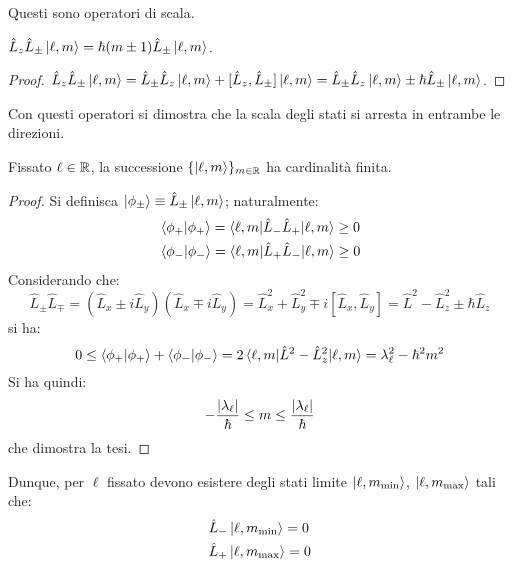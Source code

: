 Questi sono operatori di scala.

\begin{proposition}\label{l-ladder}
	$ \hat{L}_z\hat{L}_{\pm} \ket{\ell,m} = \hbar (m \pm 1) \hat{L}_{\pm} \ket{\ell,m} $.
\end{proposition}
\begin{proof}
	$ \hat{L}_z \hat{L}_{\pm} \ket{\ell,m} = \hat{L}_{\pm} \hat{L}_z \ket{\ell,m} + [\hat{L}_z,\hat{L}_{\pm}]\ket{\ell,m} = \hat{L}_{\pm} \hat{L}_z \ket{\ell,m} \pm \hbar \hat{L}_{\pm} \ket{\ell,m} $.
\end{proof}

Con questi operatori si dimostra che la scala degli stati si arresta in entrambe le direzioni.

\begin{proposition}
	Fissato $ \ell\in\mathbb{R} $, la successione $ \{ \ket{\ell,m} \}_{m\in\mathbb{R}} $ ha cardinalità finita.
\end{proposition}
\begin{proof}
	Si definisca $ \ket{\phi_{\pm}} \equiv \hat{L}_{\pm} \ket{\ell,m} $; naturalmente:
	\begin{equation*}
		\begin{split}
			&\braket{\phi_+ | \phi_+} = \braket{\ell,m | \hat{L}_- \hat{L}_+ | \ell,m} \ge 0\\
			&\braket{\phi_- | \phi_-} = \braket{\ell,m | \hat{L}_+ \hat{L}_- | \ell,m} \ge 0
		\end{split}
	\end{equation*}
	Considerando che:
	\begin{equation*}
		\hat{L}_{\pm} \hat{L}_{\mp} = ( \hat{L}_x \pm i\hat{L}_y ) ( \hat{L}_x \mp i\hat{L}_y ) = \hat{L}_x^2 + \hat{L}_y^2 \mp i [\hat{L}_x,\hat{L}_y] = \hat{L}^2 - \hat{L}_z^2 \pm \hbar\hat{L}_z
	\end{equation*}
	si ha:
	\begin{equation*}
		0 \le \braket{\phi_+ | \phi_+} + \braket{\phi_- | \phi_-} = 2 \braket{\ell,m | \hat{L}^2 - \hat{L}_z^2 | \ell,m} = \lambda_{\ell}^2 - \hbar^2 m^2
	\end{equation*}
	Si ha quindi:
	\begin{equation*}
		- \frac{\left\lvert\lambda_{\ell}\right\rvert}{\hbar} \le m \le \frac{\left\lvert\lambda_{\ell}\right\rvert}{\hbar}
	\end{equation*}
	che dimostra la tesi.
\end{proof}
Dunque, per $ \ell $ fissato devono esistere degli stati limite $ \ket{\ell,m_{\text{min}}} $, $ \ket{\ell,m_{\text{max}}} $ tali che:
\begin{equation}
	\begin{split}
		&\hat{L}_- \ket{\ell,m_{\text{min}}} = 0 \\
		&\hat{L}_+ \ket{\ell,m_{\text{max}}} = 0
	\end{split}
	\label{eq:2.17}
\end{equation}
